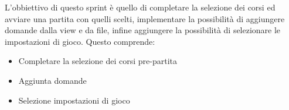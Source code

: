 L'obbiettivo di questo sprint è quello di completare la selezione dei corsi ed avviare una partita con quelli scelti, implementare la possibilità di aggiungere domande dalla view e da file, infine aggiungere la possibilità di selezionare le impostazioni di gioco. 
Questo comprende:
\begin{itemize}
    \item Completare la selezione dei corsi pre-partita
    \item Aggiunta domande
    \item Selezione impostazioni di gioco
\end{itemize} 